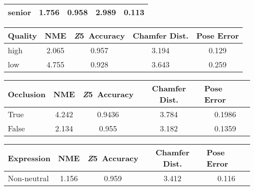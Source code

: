 \documentclass[10pt,twocolumn,letterpaper]{article}
\begin{document}
\begin{table}
\begin{tabular}{l|cccc}
senior                           & 1.756                 & 0.958                                                    & 2.989                          & 0.113                                             \\
\bottomrule
\end{tabular}
\footnotesize
\label{T:allmetrics}
\begin{tabular}{l|cccc} 
\toprule
\multicolumn{1}{c}{\textbf{Quality}} & \textbf{\textbf{NME}} & \textbf{\textbf{\textit{Z}5}}~\textbf{\textbf{Accuracy}} & \textbf{\textbf{Chamfer Dist.}} & \multicolumn{1}{l}{\textbf{\textbf{Pose Error}}}  \\ 
\toprule
high                                 & 2.065                 & 0.957                                                    & 3.194                          & 0.129                                             \\
low                                  & 4.755                 & 0.928                                                    & 3.643                          & 0.259                                             \\
\bottomrule
\end{tabular}
\footnotesize
\label{T:allmetrics}
\begin{tabular}{l|cccc} 
\toprule
\multicolumn{1}{c}{\textbf{Occlusion}} & \textbf{\textbf{NME}} & \textbf{\textbf{\textit{Z}5}}~\textbf{\textbf{Accuracy}} & \textbf{\textbf{Chamfer Dist.}} & \multicolumn{1}{l}{\textbf{\textbf{Pose Error}}}  \\ 
\toprule
True                                   & 4.242                 & 0.9436                                                   & 3.784                           & 0.1986                                            \\
False                                  & 2.134                 & 0.955                                                    & 3.182                           & 0.1359                                            \\
\bottomrule
\end{tabular}
\footnotesize
\label{T:allmetrics}
\begin{tabular}{l|cccc} 
\toprule
\multicolumn{1}{c}{\textbf{Expression}} & \textbf{\textbf{NME}} & \textbf{\textbf{\textit{Z}5}}~\textbf{\textbf{Accuracy}} & \textbf{\textbf{Chamfer Dist.}} & \multicolumn{1}{l}{\textbf{\textbf{Pose Error}}}  \\ 
\toprule
Non-neutral                                    & 1.156                 & 0.959                                                    & 3.412                           & 0.116                                             \\

\end{tabular}
\end{table}
\end{document}
